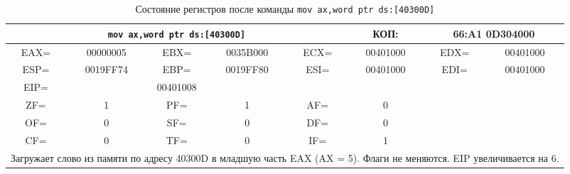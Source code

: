 \begin{table}[H]
    \centering
    \caption{Состояние регистров после команды \texttt{mov ax,word ptr ds:[40300D]}}
    \label{tab:after_mov_ax}
    \small
    \renewcommand{\arraystretch}{1.3}
    \begin{tabular}{|c|c|c|c|c|c|c|c|}
    \hline
    \multicolumn{5}{|c|}{\cellcolor{green!40}\textbf{\texttt{mov ax,word ptr ds:[40300D]}}} & \cellcolor{green!20} КОП: & \multicolumn{2}{c|}{\cellcolor{green!20} 66:A1 0D304000} \\
    \hline
    \cellcolor{blue!30} EAX= & \cellcolor{red!70} 00000005 & \cellcolor{blue!30} EBX= & 0035B000 & \cellcolor{blue!30} ECX= & 00401000 & \cellcolor{blue!30} EDX= & 00401000 \\
    \hline
    \cellcolor{blue!30} ESP= & 0019FF74 & \cellcolor{blue!30} EBP= & 0019FF80 & \cellcolor{blue!30} ESI= & 00401000 & \cellcolor{blue!30} EDI= & 00401000 \\
    \hline
    \cellcolor{blue!30} EIP= & \multicolumn{3}{c|}{\cellcolor{red!70} 00401008} & \multicolumn{4}{c|}{} \\
    \hline
    \cellcolor{pink} ZF= & 1 & \cellcolor{pink} PF= & 1 & \cellcolor{pink} AF= & 0 & \multicolumn{2}{c|}{\cellcolor{gray!50}} \\
    \cline{1-6}
    \cellcolor{pink} OF= & 0 & \cellcolor{pink} SF= & 0 & \cellcolor{pink} DF= & 0 & \multicolumn{2}{c|}{\cellcolor{gray!50}} \\
    \cline{1-6}
    \cellcolor{pink} CF= & 0 & \cellcolor{pink} TF= & 0 & \cellcolor{pink} IF= & 1 & \multicolumn{2}{c|}{\cellcolor{gray!50}} \\
    \hline
    \multicolumn{8}{|p{14cm}|}{Загружает слово из памяти по адресу 40300D в младшую часть EAX (AX = 5). Флаги не меняются. EIP увеличивается на 6.} \\
    \hline
    \end{tabular}
\end{table}

